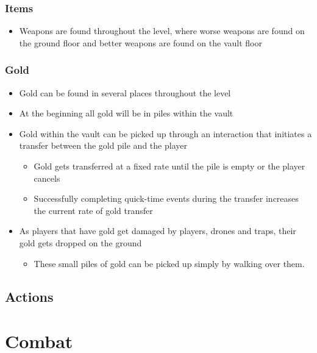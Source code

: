 \documentclass[14pt]{report}
\begin{document}
\subsubsection{Items}
\begin{itemize}
    \item Weapons are found throughout the level, where worse weapons are found on the ground floor and better weapons are found on the vault floor
\end{itemize}
\subsubsection{Gold}
\begin{itemize}
    \item Gold can be found in several places throughout the level
    \item At the beginning all gold will be in piles within the vault
    \item Gold within the vault can be picked up through an interaction that initiates a transfer between the gold pile and the player
    \begin{itemize}
        \item Gold gets transferred at a fixed rate until the pile is empty or the player cancels
        \item Successfully completing quick-time events during the transfer increases the current rate of gold transfer
    \end{itemize}
    \item As players that have gold get damaged by players, drones and traps, their gold gets dropped on the ground
    \begin{itemize}
        \item These small piles of gold can be picked up simply by walking over them.
    \end{itemize}
\end{itemize}
\subsection{Actions}

\section{Combat}
\end{document}
